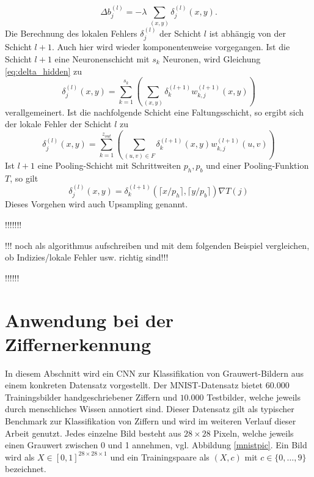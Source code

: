 \begin{equation*}
    \Delta b_j^{(l)}= -\lambda \, \sum_{(x,y)} \delta_j^{(l)}(x,y).
\end{equation*}
Die Berechnung des lokalen Fehlers $\delta_{j}^{(l)}$ der Schicht $l$ ist abhängig von der Schicht $l+1$. Auch hier wird wieder komponentenweise vorgegangen. Ist die Schicht $l+1$ eine Neuronenschicht mit $s_k$ Neuronen, wird Gleichung \ref{eq:delta_hidden} zu
\begin{equation*}
    \delta_j^{(l)}(x,y)=\sum_{k=1}^{s_{k}} \left(\sum_{(x,y)} \delta_k^{(l+1)} w_{k,j}^{(l+1)}(x,y)\right) 
\end{equation*}
verallgemeinert. Ist die nachfolgende Schicht eine Faltungsschicht, so ergibt sich der lokale Fehler der Schicht $l$ zu
\begin{equation*}
    \delta_j^{(l)}(x,y)=\sum_{k=1}^{z_{out}} \left(\sum_{(u,v) \in F} \delta_k^{(l+1)}(x,y) w_{k,j}^{(l+1)}(u,v)\right)
\end{equation*}
Ist $l+1$ eine Pooling-Schicht mit Schrittweiten $p_h,p_b$ und einer Pooling-Funktion $T$, so gilt
\begin{equation*}
    \delta_j^{(l)}(x,y)=\delta_k^{(l+1)}(\lceil x/p_h \rceil ,\lceil y/p_b \rceil) \nabla T(j)
\end{equation*}
Dieses Vorgehen wird auch Upsampling genannt.

!!!!!!!

!!! noch als algorithmus aufschreiben und mit dem folgenden Beispiel vergleichen, ob Indizies/lokale Fehler usw. richtig sind!!!

!!!!!!


\section{Anwendung bei der Ziffernerkennung}
In diesem Abschnitt wird ein CNN zur Klassifikation von Grauwert-Bildern aus einem konkreten Datensatz vorgestellt. Der MNIST-Datensatz\cite{DBLP:journals/pieee/LeCunBBH98} bietet $60.000$ Trainingsbilder handgeschriebener Ziffern und $10.000$ Testbilder, welche jeweils durch menschliches Wissen annotiert sind. Dieser Datensatz gilt als typischer Benchmark zur Klassifikation von Ziffern und wird im weiteren Verlauf dieser Arbeit genutzt. Jedes einzelne Bild besteht aus $28 \times 28$ Pixeln, welche jeweils einen Grauwert zwischen 0 und 1 annehmen, vgl. Abbildung \ref{mnistpic}. Ein Bild wird als $X \in [0,1]^{28 \times 28 \times 1}$ und ein Trainingspaare als $(X,c)$ mit $c \in \{0, \ldots, 9\}$ bezeichnet. 

